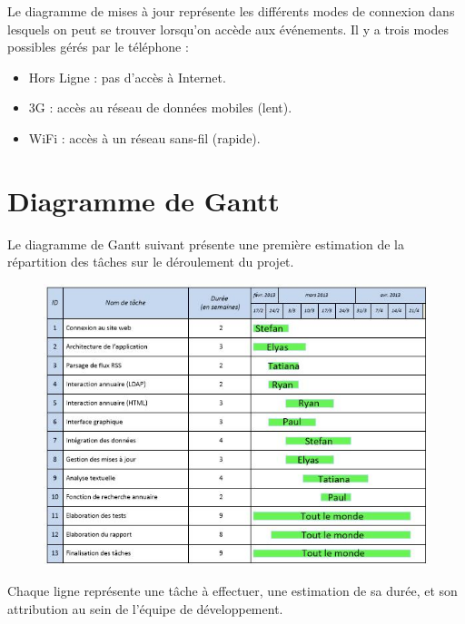 Le diagramme de mises à jour représente les différents modes de connexion dans lesquels on peut se trouver lorsqu'on accède aux événements. Il y a trois modes possibles gérés par le téléphone :\\
\begin{itemize}
\renewcommand{\labelitemi}{$\bullet$}
 \item Hors Ligne : pas d'accès à Internet.
 \item 3G :  accès au réseau de données mobiles (lent).
 \item WiFi : accès à un réseau sans-fil (rapide).
\end{itemize}

\newpage

\section{Diagramme de Gantt}
Le diagramme de Gantt suivant présente une première estimation de la répartition des tâches sur le déroulement du projet. 

\begin{figure}[h]
  \center
  \includegraphics[width=1.0\textwidth]{resources/gantt.jpg}
\end{figure}

Chaque ligne représente une tâche à effectuer, une estimation de sa durée, et son attribution au sein de l'équipe de développement. \\